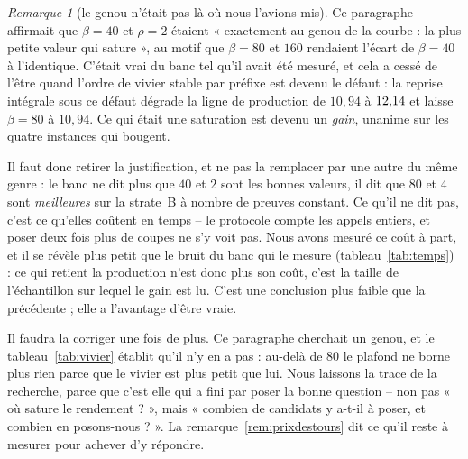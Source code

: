 \documentclass[11pt,a4paper]{article}
\theoremstyle{plain}
\theoremstyle{remark}
\newtheorem{remark}{Remarque}
\begin{document}
\begin{remark}[le genou n'était pas là où nous l'avions mis]
\label{rem:genou}
Ce paragraphe affirmait que $\beta=40$ et $\rho=2$ étaient « exactement au
genou de la courbe : la plus petite valeur qui sature », au motif que
$\beta=80$ et $160$ rendaient l'écart de $\beta=40$ à l'identique. C'était
vrai du banc tel qu'il avait été mesuré, et cela a cessé de l'être quand
l'ordre de vivier stable par préfixe est devenu le défaut : la reprise
intégrale sous ce défaut dégrade la ligne de production de $10{,}94$ à
$12{,}14{}$ et laisse $\beta=80$ à $10{,}94$. Ce qui était une saturation est
devenu un \emph{gain}, unanime sur les quatre instances qui bougent.

Il faut donc retirer la justification, et ne pas la remplacer par une autre
du même genre : le banc ne dit plus que $40$ et $2$ sont les bonnes
valeurs, il dit que $80$ et $4$ sont \emph{meilleures} sur la strate~B à
nombre de preuves constant. Ce qu'il ne dit pas, c'est ce qu'elles coûtent
en temps -- le protocole compte les appels entiers, et poser deux fois plus
de coupes ne s'y voit pas. Nous avons mesuré ce coût à part, et il se révèle
plus petit que le bruit du banc qui le mesure
(tableau~\ref{tab:temps}) : ce qui retient la production n'est donc plus son
coût, c'est la taille de l'échantillon sur lequel le gain est lu. C'est une
conclusion plus faible que la précédente ; elle a l'avantage d'être vraie.

Il faudra la corriger une fois de plus. Ce paragraphe cherchait un genou,
et le tableau~\ref{tab:vivier} établit qu'il n'y en a pas : au-delà de $80$
le plafond ne borne plus rien parce que le vivier est plus petit que lui.
Nous laissons la trace de la recherche, parce que c'est elle qui a fini par
poser la bonne question -- non pas « où sature le rendement ? », mais
« combien de candidats y a-t-il à poser, et combien en posons-nous ? ». La
remarque~\ref{rem:prixdestours} dit ce qu'il reste à mesurer pour achever
d'y répondre.
\end{remark}
\end{document}
